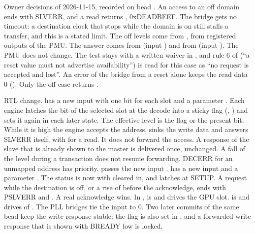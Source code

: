 \begin{record}

Owner decisions of 2026-11-15, recorded on bead . An access to an off domain ends with SLVERR, and a read returns , 0xDEADBEEF. The bridge gets no timeout: a destination clock that stops while the domain is on still stalls a transfer, and this is a stated limit. The off levels come from , from registered outputs of the PMU. The answer comes from  (input ) and from  (input ). The PMU does not change. The test  stays  with a written waiver in , and rule 6 of  (``a reset value must not advertise availability'') is read for this case as ``no request is accepted and lost''. An error of the bridge from a reset alone keeps the read data 0 (). Only the off case returns .

\end{record}

\begin{record}

RTL change.  has a new input  with one bit for each slot and a parameter . Each engine latches the bit of the selected slot at the decode into a sticky flag (, ) and sets it again in each later state. The effective level is the flag or the present bit. While it is high the engine accepts the address, sinks the write data and answers SLVERR itself, with  for a read. It does not forward the access. A response of the slave that is already shown to the master is delivered once, unchanged. A fall of the level during a transaction does not resume forwarding. DECERR for an unmapped address has priority.  passes the new input .  has a new input  and a parameter . The status  is now  with  cleared in, and  latches  at SETUP. A request while the destination is off, or a rise of  before the acknowledge, ends with PSLVERR and . A real acknowledge wins. In ,  is  and drives the GPU slot.  is  and drives  of . The PLL bridges tie the input to 0. Two later commits of the same bead keep the write response stable: the flag is also set in , and a forwarded write response that is shown with BREADY low is locked.

\end{record}

